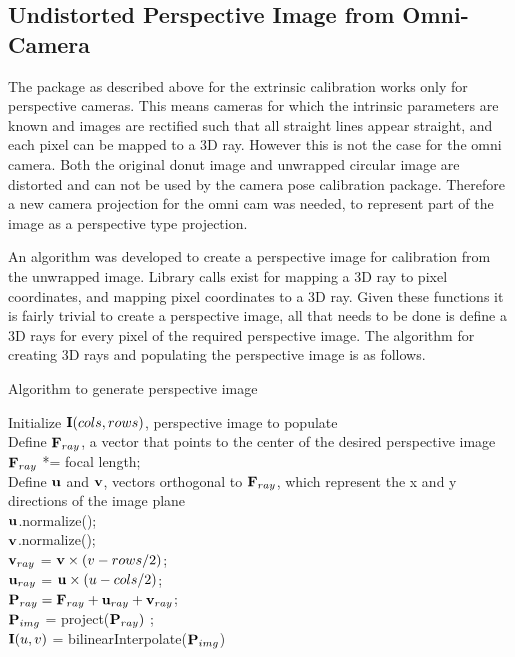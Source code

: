 \subsection{Undistorted Perspective Image from Omni-Camera}

The package as described above for the extrinsic calibration works only for perspective cameras. This means cameras for which the intrinsic parameters are known and images are rectified such that all straight lines appear straight, and each pixel can be mapped to a 3D ray.  However this is not the case for the omni camera.  Both the original donut image and unwrapped circular image are distorted and can not be used by the camera pose calibration package.  Therefore a new camera projection for the omni cam was needed, to represent part of the image as a perspective type projection.

An algorithm was developed to create a perspective image for calibration from the unwrapped image.  Library calls exist for mapping a 3D ray to pixel coordinates, and mapping pixel coordinates to a 3D ray.  Given these functions it is fairly trivial to create a perspective image, all that needs to be done is define a 3D rays for every pixel of the required perspective image.  The algorithm for creating 3D rays and populating the perspective image is as follows.

\begin{algorithm}[h!]
 \caption{Algorithm to generate perspective image}
 Initialize $\mathbf I(cols,rows)$, perspective image to populate \\
 Define $\mathbf F_{ray}$, a vector that points to the center of the desired perspective image \\
 $\mathbf F_{ray}$ *= focal length; \\
 Define $\mathbf u$ and $\mathbf v$, vectors orthogonal to $\mathbf F_{ray}$, which represent the x and y directions of the image plane \\
 $\mathbf u$.normalize(); \\
 $\mathbf v$.normalize(); \\
 {
   $\mathbf v_{ray}$ = $\mathbf v \times (v - rows/2)$; \\
   {
     $\mathbf u_{ray}$ = $\mathbf u \times (u - cols/2)$; \\
     $\mathbf P_{ray} = \mathbf F_{ray} + \mathbf u_{ray} + \mathbf v_{ray}$; \\
     $\mathbf P_{img}$ = project($\mathbf P_{ray})$ ; \\
     $\mathbf I(u,v)$ = bilinearInterpolate($\mathbf P_{img}$)
   }
 }
\end{algorithm}

